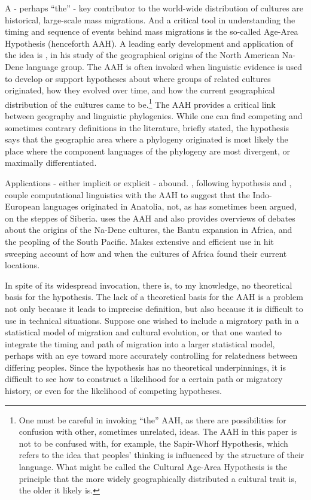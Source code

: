 \documentclass[11pt]{article}
\begin{document}
A - perhaps ``the'' - key contributor to the world-wide distribution of cultures are historical, large-scale mass migrations. And a critical tool in understanding the timing and sequence of events behind mass migrations is the so-called Age-Area Hypothesis (henceforth AAH). A leading early development and application of the idea is \cite{sapir16}, in his study of the geographical origins of the North American Na-Dene language group. The AAH is often invoked when linguistic evidence is used to develop or support hypotheses about where groups of related  cultures originated, how they evolved over time, and how the current geographical distribution of the cultures came to be.\footnote{One must be careful in invoking ``the'' AAH, as there are possibilities for confusion with other, sometimes unrelated, ideas. The AAH in this paper is not to be confused with, for example, the Sapir-Whorf Hypothesis, which refers to the idea that peoples' thinking is influenced by the structure of their language. What might be called the Cultural Age-Area Hypothesis is the principle that the more widely geographically distributed a cultural trait is, the older it likely is. } The AAH provides a critical link between geography and linguistic phylogenies. While one can find competing and sometimes contrary definitions in the literature, briefly stated, the hypothesis says that the geographic area where a phylogeny originated is most likely the place where the component languages of the phylogeny are most divergent, or maximally differentiated.

Applications - either implicit or explicit  - abound. \cite{atkinson03}, following \cite{renfrew87} hypothesis and \cite{dogolpolsky88}, couple computational linguistics with the AAH to suggest that the Indo-European languages originated in Anatolia, not, as has sometimes been argued, on the steppes of Siberia. \cite{ruhlen94} uses the AAH and also provides overviews of debates about the origins of the Na-Dene cultures, the Bantu expansion in Africa, and the peopling of the South Pacific. \cite{ehret01} Makes extensive and efficient use in hit sweeping account of how and when the cultures of Africa found their current locations.

In spite of its widespread invocation, there is, to my knowledge, no theoretical basis for the hypothesis. The lack of a theoretical basis for the  AAH is a problem not only because it leads to imprecise definition, but also because it is difficult to use in technical situations. Suppose one wished to include a migratory path in a statistical model of migration and cultural evolution, or that one wanted to integrate the timing and path of migration into a larger statistical model, perhaps with an eye toward more accurately controlling for relatedness between differing peoples. Since the hypothesis has no theoretical underpinnings, it is difficult to see how to construct a likelihood for a certain path or migratory history, or even for the likelihood of competing hypotheses.
\end{document}
